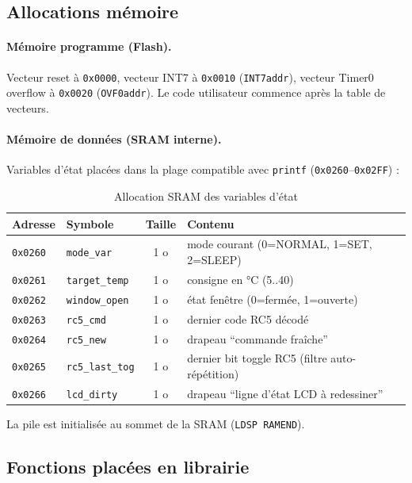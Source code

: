 \documentclass[11pt]{article}
\begin{document}
\subsection{Allocations mémoire}

\paragraph{Mémoire programme (Flash).} Vecteur reset à \texttt{0x0000}, vecteur INT7 à \texttt{0x0010} (\texttt{INT7addr}), vecteur Timer0 overflow à \texttt{0x0020} (\texttt{OVF0addr}). Le code utilisateur commence après la table de vecteurs.

\paragraph{Mémoire de données (SRAM interne).} Variables d'état placées dans la plage compatible avec \texttt{printf} (\texttt{0x0260}--\texttt{0x02FF}) :

\begin{table}[h]
\centering
\begin{tabular}{@{}llcp{7cm}@{}}
\toprule
\textbf{Adresse} & \textbf{Symbole} & \textbf{Taille} & \textbf{Contenu} \\
\midrule
\texttt{0x0260} & \texttt{mode\_var}     & 1 o & mode courant (0=NORMAL, 1=SET, 2=SLEEP) \\
\texttt{0x0261} & \texttt{target\_temp}  & 1 o & consigne en °C (5..40) \\
\texttt{0x0262} & \texttt{window\_open}  & 1 o & état fenêtre (0=fermée, 1=ouverte) \\
\texttt{0x0263} & \texttt{rc5\_cmd}      & 1 o & dernier code RC5 décodé \\
\texttt{0x0264} & \texttt{rc5\_new}      & 1 o & drapeau ``commande fraîche'' \\
\texttt{0x0265} & \texttt{rc5\_last\_tog}& 1 o & dernier bit toggle RC5 (filtre auto-répétition) \\
\texttt{0x0266} & \texttt{lcd\_dirty}    & 1 o & drapeau ``ligne d'état LCD à redessiner'' \\
\bottomrule
\end{tabular}
\caption{Allocation SRAM des variables d'état}
\label{tab:sram}
\end{table}

La pile est initialisée au sommet de la SRAM (\texttt{LDSP RAMEND}).

\subsection{Fonctions placées en librairie}
\end{document}
